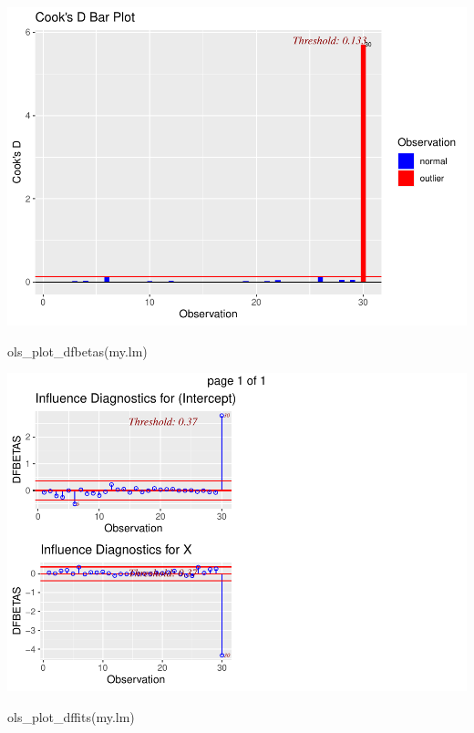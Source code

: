 \documentclass[
]{book}
\newenvironment{Shaded}{\begin{snugshade}}{\end{snugshade}}
\newcommand{\FunctionTok}[1]{\textcolor[rgb]{0.00,0.00,0.00}{#1}}
\newcommand{\NormalTok}[1]{#1}
\begin{document}
\includegraphics{13-MultipleLinearRegression_files/figure-latex/unnamed-chunk-19-1.pdf}

\begin{Shaded}
\begin{Highlighting}[]
\FunctionTok{ols\_plot\_dfbetas}\NormalTok{(my.lm)}
\end{Highlighting}
\end{Shaded}

\includegraphics{13-MultipleLinearRegression_files/figure-latex/unnamed-chunk-19-2.pdf}

\begin{Shaded}
\begin{Highlighting}[]
\FunctionTok{ols\_plot\_dffits}\NormalTok{(my.lm)}
\end{Highlighting}
\end{Shaded}
\end{document}
